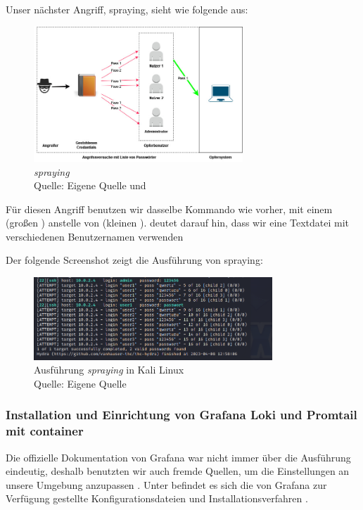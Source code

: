 Unser nächster Angriff, \gls{spraying}, sieht wie folgende aus:
\begin{figure}[H]
   \centering
   \includegraphics[width=0.7\textwidth]{assets/Spraying.jpg}
   \caption{\textit{\gls{spraying}}\\Quelle: Eigene Quelle und \citep{Swathi_spraxy}}
   \centering
\end{figure}

Für diesen Angriff benutzen wir dasselbe Kommando wie vorher, mit einem  (großen ) anstelle von  (kleinen ).  deutet darauf hin, dass wir eine Textdatei mit verschiedenen Benutzernamen verwenden 

Der folgende Screenshot zeigt die Ausführung von \gls{spraying}:
\begin{figure}[H]
   \centering
   \includegraphics[width=0.8\textwidth]{assets/Spraying_Kali.png}
   \caption{Ausführung \textit{\gls{spraying}} in Kali Linux \\Quelle: Eigene Quelle}
   \centering
\end{figure}

\subsubsection{Installation und Einrichtung von Grafana Loki und Promtail mit \gls{container}}
Die offizielle Dokumentation von Grafana war nicht immer über die Ausführung eindeutig, deshalb benutzten wir auch fremde Quellen, um die Einstellungen an unsere Umgebung anzupassen \citep{Polinowski_PGL}. Unter befindet es sich die von Grafana zur Verfügung gestellte Konfigurationsdateien und Installationsverfahren \citep{GrafanaLoki_run}. 

